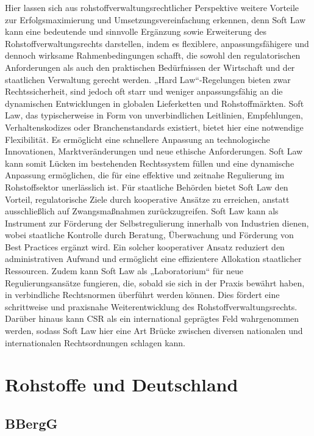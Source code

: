 \documentclass[12pt,a4paper,oneside]{book} %
\begin{document}
	Hier lassen sich aus rohstoffverwaltungsrechtlicher Perspektive weitere Vorteile zur Erfolgsmaximierung und Umsetzungsvereinfachung erkennen, denn Soft Law kann eine bedeutende und sinnvolle Ergänzung sowie Erweiterung des Rohstoffverwaltungsrechts darstellen, indem es flexiblere, anpassungsfähigere und dennoch wirksame Rahmenbedingungen schafft, die sowohl den regulatorischen Anforderungen als auch den praktischen Bedürfnissen der Wirtschaft und der staatlichen Verwaltung gerecht werden. „Hard Law“-Regelungen bieten zwar Rechtssicherheit, sind jedoch oft starr und weniger anpassungsfähig an die dynamischen Entwicklungen in globalen Lieferketten und Rohstoffmärkten. Soft Law, das typischerweise in Form von unverbindlichen Leitlinien, Empfehlungen, Verhaltenskodizes oder Branchenstandards existiert, bietet hier eine notwendige Flexibilität. Es ermöglicht eine schnellere Anpassung an technologische Innovationen, Marktveränderungen und neue ethische Anforderungen. Soft Law kann somit Lücken im bestehenden Rechtssystem füllen und eine dynamische Anpassung ermöglichen, die für eine effektive und zeitnahe Regulierung im Rohstoffsektor unerlässlich ist. Für staatliche Behörden bietet Soft Law den Vorteil, regulatorische Ziele durch kooperative Ansätze zu erreichen, anstatt ausschließlich auf Zwangsmaßnahmen zurückzugreifen. Soft Law kann als Instrument zur Förderung der Selbstregulierung innerhalb von Industrien dienen, wobei staatliche Kontrolle durch Beratung, Überwachung und Förderung von Best Practices ergänzt wird. Ein solcher kooperativer Ansatz reduziert den administrativen Aufwand und ermöglicht eine effizientere Allokation staatlicher Ressourcen. Zudem kann Soft Law als „Laboratorium“ für neue Regulierungsansätze fungieren, die, sobald sie sich in der Praxis bewährt haben, in verbindliche Rechtsnormen überführt werden können. Dies fördert eine schrittweise und praxisnahe Weiterentwicklung des Rohstoffverwaltungsrechts. Darüber hinaus kann CSR als ein international geprägtes Feld wahrgenommen werden, sodass Soft Law hier eine Art Brücke zwischen diversen nationalen und internationalen Rechtsordnungen schlagen kann.
	
	
	\section{Rohstoffe und Deutschland}
	
	\subsection{BBergG}
	
\end{document}
